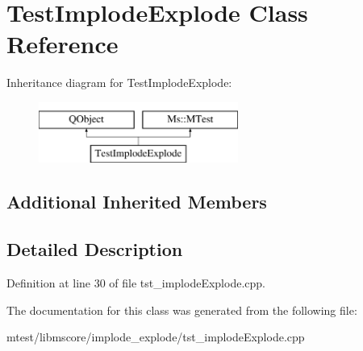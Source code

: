 \hypertarget{class_test_implode_explode}{}\section{Test\+Implode\+Explode Class Reference}
\label{class_test_implode_explode}
Inheritance diagram for Test\+Implode\+Explode\+:\begin{figure}[H]
\begin{center}
\leavevmode
\includegraphics[height=2.000000cm]{class_test_implode_explode}
\end{center}
\end{figure}
\subsection*{Additional Inherited Members}


\subsection{Detailed Description}


Definition at line 30 of file tst\+\_\+implode\+Explode.\+cpp.



The documentation for this class was generated from the following file\+:\begin{DoxyCompactItemize}
\item 
mtest/libmscore/implode\+\_\+explode/tst\+\_\+implode\+Explode.\+cpp\end{DoxyCompactItemize}
